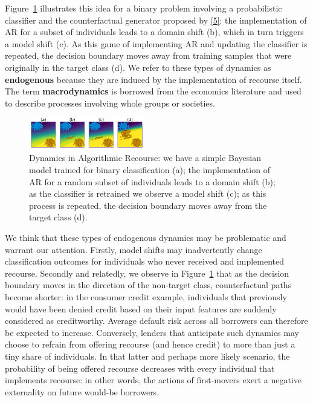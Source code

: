 \documentclass[
  conference]{IEEEtran}
\begin{document}
Figure~\ref{fig-poc} illustrates this idea for a binary problem
involving a probabilistic classifier and the counterfactual generator
proposed by \protect\hyperlink{ref-wachter2017counterfactual}{{[}5{]}}:
the implementation of AR for a subset of individuals leads to a domain
shift (b), which in turn triggers a model shift (c). As this game of
implementing AR and updating the classifier is repeated, the decision
boundary moves away from training samples that were originally in the
target class (d). We refer to these types of dynamics as
\textbf{endogenous} because they are induced by the implementation of
recourse itself. The term \textbf{macrodynamics} is borrowed from the
economics literature and used to describe processes involving whole
groups or societies.

\begin{figure}

{\centering \includegraphics[width=0.45\textwidth,height=\textheight]{www/poc.png}

}

\caption{\label{fig-poc}Dynamics in Algorithmic Recourse: we have a
simple Bayesian model trained for binary classification (a); the
implementation of AR for a random subset of individuals leads to a
domain shift (b); as the classifier is retrained we observe a model
shift (c); as this process is repeated, the decision boundary moves away
from the target class (d).}

\end{figure}

We think that these types of endogenous dynamics may be problematic and
warrant our attention. Firstly, model shifts may inadvertently change
classification outcomes for individuals who never received and
implemented recourse. Secondly and relatedly, we observe in
Figure~\ref{fig-poc} that as the decision boundary moves in the
direction of the non-target class, counterfactual paths become shorter:
in the consumer credit example, individuals that previously would have
been denied credit based on their input features are suddenly considered
as creditworthy. Average default risk across all borrowers can therefore
be expected to increase. Conversely, lenders that anticipate such
dynamics may choose to refrain from offering recourse (and hence credit)
to more than just a tiny share of individuals. In that latter and
perhaps more likely scenario, the probability of being offered recourse
decreases with every individual that implements recourse: in other
words, the actions of first-movers exert a negative externality on
future would-be borrowers.
\end{document}
